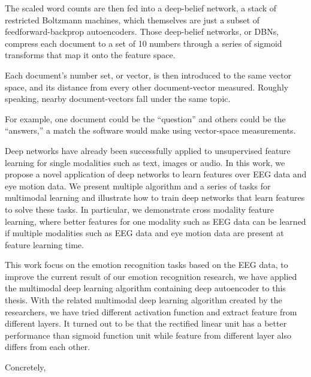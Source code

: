\begin{bigabstract}
\begin{itemize}
	The scaled word counts are then fed into a deep-belief network, a stack of restricted Boltzmann machines, which themselves are just a subset of feedforward-backprop autoencoders. Those deep-belief networks, or DBNs, compress each document to a set of 10 numbers through a series of sigmoid transforms that map it onto the feature space.
	
	Each document’s number set, or vector, is then introduced to the same vector space, and its distance from every other document-vector measured. Roughly speaking, nearby document-vectors fall under the same topic.
	
	For example, one document could be the “question” and others could be the “answers,” a match the software would make using vector-space measurements.
\end{itemize}

	Deep networks have already been successfully applied to unsupervised feature learning for single modalities such as text, images or audio. In this work, we propose a novel application of deep networks to learn features over EEG data and eye motion data. We present multiple algorithm and a series of tasks for multimodal learning and illustrate how to train deep networks that learn features to solve these tasks. In particular, we demonstrate cross modality feature learning, where better features for one modality such as EEG data can be learned if multiple modalities such as EEG data and eye motion data are present at feature learning time. 

	This work focus on the emotion recognition tasks based on the EEG data, to improve the current result of our emotion recognition research, we have applied the multimodal deep learning algorithm containing deep autoencoder to this thesis. With the related multimodal deep learning algorithm created by the researchers, we have tried different activation function and extract feature from different layers. It turned out to be that the rectified linear unit has a better performance than sigmoid function unit while feature from different layer also differs from each other.

	Concretely, 


\end{bigabstract}
